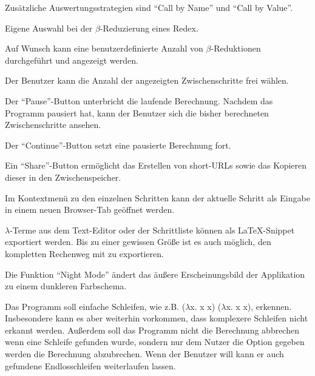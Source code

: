 \documentclass[parskip=full,11pt,twoside]{scrartcl}
\begin{document}
Zusätzliche Auswertungsstrategien sind \enquote{Call by Name} und \enquote{Call by Value}.

Eigene Auswahl bei der $\beta$-Reduzierung eines Redex.

Auf Wunsch kann eine benutzerdefinierte Anzahl von $\beta$-Reduktionen durchgeführt und angezeigt werden.

Der Benutzer kann die Anzahl der angezeigten Zwischenschritte frei wählen.

Der \enquote{Pause}-Button unterbricht die laufende Berechnung. Nachdem das Programm pausiert hat, kann der Benutzer sich die bisher berechneten Zwischenschritte ansehen.

Der \enquote{Continue}-Button setzt eine pausierte Berechnung fort.

Ein \enquote{Share}-Button ermöglicht das Erstellen von short-URLs sowie das Kopieren dieser in den Zwischenspeicher.

Im Kontextmenü zu den einzelnen Schritten kann der aktuelle Schritt als Eingabe in einem neuen Browser-Tab geöffnet werden.

$\lambda$-Terme aus dem Text-Editor oder der Schrittliste können als LaTeX-Snippet exportiert werden. Bis zu einer gewissen Größe ist es auch möglich, den kompletten Rechenweg mit zu exportieren.

Die Funktion \enquote{Night Mode} ändert das äußere Erscheinungsbild der Applikation zu einem dunkleren Farbschema.

Das Programm soll einfache Schleifen, wie z.B. ($\lambda$x. x x) ($\lambda$x. x x), erkennen. Insbesondere kann es aber weiterhin vorkommen, dass komplexere Schleifen nicht erkannt werden.
Außerdem soll das Programm nicht die Berechnung abbrechen wenn eine Schleife gefunden wurde, sondern nur dem Nutzer die Option gegeben werden die Berechnung abzubrechen. Wenn der Benutzer  will kann er auch gefundene Endlosschleifen weiterlaufen lassen.
\end{document}
